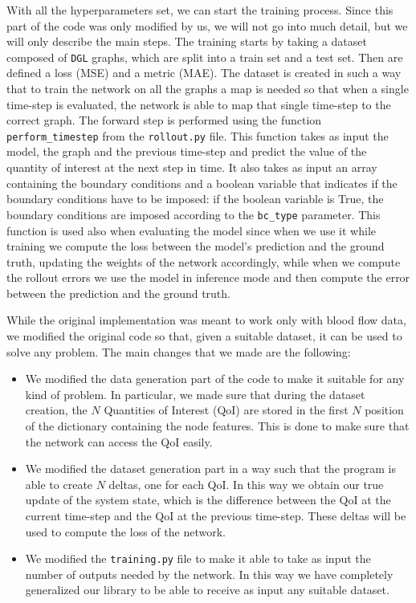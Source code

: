 \documentclass[11pt,a4paper]{article}
\begin{document}
With all the hyperparameters set, we can start the training process. Since this part of the code was only modified by us, we will not go into much detail, but we will only describe the main steps. The training starts by taking a dataset composed of \texttt{DGL} graphs, which are split into a train set and a test set. Then are defined a loss (MSE) and a metric (MAE). The dataset is created in such a way that to train the network on all the graphs a map is needed so that when a single time-step is evaluated, the network is able to map that single time-step to the correct graph. The forward step is performed using the function \texttt{perform\_timestep} from the \texttt{rollout.py} file. This function takes as input the model, the graph and the previous time-step and predict the value of the quantity of interest at the next step in time. It also takes as input an array containing the boundary conditions and a boolean variable that indicates if the boundary conditions have to be imposed: if the boolean variable is True, the boundary conditions are imposed according to the \texttt{bc\_type} parameter.
This function is used also when evaluating the model since when we use it while training we compute the loss between the model's prediction and the ground truth, updating the weights of the network accordingly, while when we compute the rollout errors we use the model in inference mode and then compute the error between the prediction and the ground truth.

While the original implementation was meant to work only with blood flow data, we modified the original code so that, given a suitable dataset, it can be used to solve any problem. The main changes that we made are the following:
\begin{itemize}
    \item We modified the data generation part of the code to make it suitable for any kind of problem. In particular, we made sure that during the dataset creation, the \(N\) Quantities of Interest (QoI) are stored in the first \(N\) position of the dictionary containing the node features. This is done to make sure that the network can access the QoI easily. 
    \item We modified the dataset generation part in a way such that the program is able to create \(N\) deltas, one for each QoI. In this way we obtain our true update of the system state, which is the difference between the QoI at the current time-step and the QoI at the previous time-step. These deltas will be used to compute the loss of the network. 
    \item We modified the \texttt{training.py} file to make it able to take as input the number of outputs needed by the network. In this way we have completely generalized our library to be able to receive as input any suitable dataset.
\end{itemize}
\end{document}
